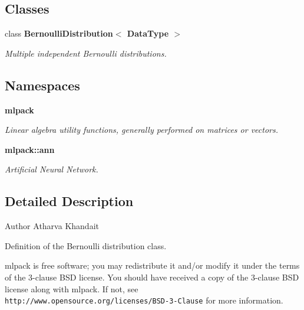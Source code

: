 \subsection*{Classes}
\begin{DoxyCompactItemize}
\item 
class \textbf{ Bernoulli\+Distribution$<$ Data\+Type $>$}
\begin{DoxyCompactList}\small\item\em Multiple independent Bernoulli distributions. \end{DoxyCompactList}\end{DoxyCompactItemize}
\subsection*{Namespaces}
\begin{DoxyCompactItemize}
\item 
 \textbf{ mlpack}
\begin{DoxyCompactList}\small\item\em Linear algebra utility functions, generally performed on matrices or vectors. \end{DoxyCompactList}\item 
 \textbf{ mlpack\+::ann}
\begin{DoxyCompactList}\small\item\em Artificial Neural Network. \end{DoxyCompactList}\end{DoxyCompactItemize}


\subsection{Detailed Description}
\begin{DoxyAuthor}{Author}
Atharva Khandait
\end{DoxyAuthor}
Definition of the Bernoulli distribution class.

mlpack is free software; you may redistribute it and/or modify it under the terms of the 3-\/clause B\+SD license. You should have received a copy of the 3-\/clause B\+SD license along with mlpack. If not, see {\tt http\+://www.\+opensource.\+org/licenses/\+B\+S\+D-\/3-\/\+Clause} for more information. 